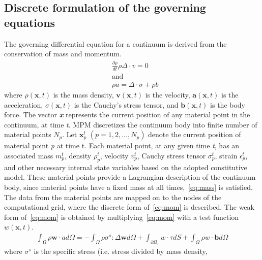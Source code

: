 \subsection{Discrete formulation of the governing equations}
The governing differential equation for a continuum is derived from the 
conservation of mass and momentum.
\begin{align}
\label{eq:mass}
& \frac{\partial \rho}{dt}\rho \Delta \cdot \mathbf{\mathit{v}}=0  \\  
\nonumber & \mbox{and} \\ 
 \label{eq:mom}
& \rho a = \Delta \cdot \sigma + \rho \mathbf{\mathit{b}}
\end{align}
where $\rho (\mathbf{x},t)$ is the mass density, $\mathit{\mathbf{v}} 
(\mathbf{x},t)$ is the velocity,  $\mathit{\mathbf{a}} (\mathbf{x},t)$ is the 
acceleration,  $\sigma (\mathbf{x},t)$ is the Cauchy's stress tensor, and  
$\mathit{\mathbf{b}} (\mathbf{x},t)$ is the body force. The vector 
\textbf{\textit{x}} represents the current position of any material point in 
the continuum, at time \textit{t}. MPM discretizes the continuum body into 
finite number of material points $\mathit{N}_{p}$. Let 
$\mathit{\mathbf{x}}_{p}^{t}$ $(\mathit{p}=1,2,\dots,\mathit{N}_{p})$ denote 
the current position of material point \textit{p} at time t.
Each material point, at any given time \textit{t}, has an associated mass 
$\mathit{m}_{p}^{t}$, density $\rho_{p}^{t}$, velocity 
$\mathbf{\mathit{v}}_{p}^{t}$, Cauchy stress tensor $\sigma_{p}^{t}$, strain 
$\epsilon_{p}^{t}$, and other necessary internal state variables based on the 
adopted constitutive model. These material points provide a Lagrangian 
description of the continuum body, since material points have a fixed mass at 
all times,~\cref{eq:mass} is satisfied. The data from the material points 
are mapped on to the nodes of the computational grid, where the discrete form 
of~\cref{eq:mom} is described. The weak form of~\cref{eq:mom} is 
obtained 
by multiplying~\cref{eq:mom} with a test function 
$\mathbf{\mathit{w}}(\mathbf{x},t)$.
\begin{align}
\int_{\Omega}\rho \mathit{\mathbf{w}} \cdot \mathbf{\mathit{a}} 
\mathit{d}\Omega = - \int_{\Omega} \rho {\sigma}^{s} : \Delta 
\mathit{\mathbf{w}} \mathit{d}\Omega + \int_{{\partial \Omega}_{\tau}} 
\mathbf{\mathit{w}} \cdot \tau \mathit{d} \mathit{S} + \int_{\Omega}\rho 
\mathbf{\mathit{w}} \cdot \mathbf{b} \mathit{d} \Omega 
\label{eq:weak}
\end{align}
where $\sigma^{s}$ is the specific stress (i.e. stress divided by mass density, 
